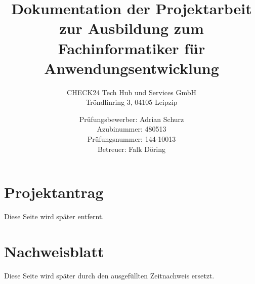 \documentclass[a4paper,11pt,draft=false,bibliography=totoc]{scrartcl} %
\author{
	Prüfungsbewerber: Adrian Schurz\\
	Azubinummer: 480513\\
	Prüfungsnummer: 144-10013\\
	Betreuer: Falk Döring
}
\title{Dokumentation der Projektarbeit zur Ausbildung zum Fachinformatiker für Anwendungsentwicklung}
\subtitle{
	CHECK24 Tech Hub und Services GmbH\\
	Tröndlinring 3, 04105 Leipzip
}
\begin{document}

\titlehead{\centering\texttt{[image: header.png]}}
\maketitle
{}
\newpage

\section{Projektantrag}
\begin{center}
	Diese Seite wird später entfernt.
\end{center}


\section{Nachweisblatt}
\begin{center}
	Diese Seite wird später durch den ausgefüllten Zeitnachweis ersetzt.
\end{center}

\newpage
\tableofcontents
\newpage


















\newpage
\printbibliography

\newpage
\printglossaries
\end{document}
